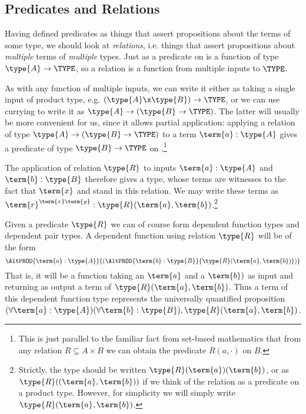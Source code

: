 \subsection{Predicates and Relations}

Having defined predicates as things that assert propositions about the terms of some type, we should look at \emph{relations}, i.e. things that assert propositions about \emph{multiple} terms of \emph{multiple} types.  Just as a predicate on  is a function of type 
$\type{A} \to \TYPE$, so a relation is a function from multiple inputs to $\TYPE$.  

As with any function of multiple inputs, we can write it either as taking a single input of product type, e.g. 
$(\type{A} \x \type{B}) \to \TYPE$, or we can use currying to write it as $\type{A} \to (\type{B} \to \TYPE)$.  The latter will usually be more convenient for us, since it allows partial application: applying a relation of type
$\type{A} \to (\type{B} \to \TYPE)$ to a term $\term{a}:\type{A}$ gives a predicate 
of type $\type{B} \to \TYPE$ on .\footnote{
This is just parallel to the familiar fact from set-based mathematics that from any relation $R \subseteq A \times B$ we can obtain the predicate $R(a,\cdot)$ on $B$.
}

The application of relation $\type{R}$ to inputs $\term{a}:\type{A}$ and $\term{b}:\type{B}$ therefore gives a type, whose terms are witnesses to the fact that $\term{x}$ and  stand in this relation.  We may write these terms as $\term{r}^{\term{x}\term{y}}:\type{R}(\term{a}, \term{b})$.\footnote{
Strictly, the type should be written 
$\type{R}(\term{a})(\term{b})$, or as $\type{R}((\term{a}, \term{b}))$ if we think of the relation as a predicate on a product type.  However, for simplicity we will simply write $\type{R}(\term{a}, \term{b})$.
}



Given a predicate $\type{R}$
we can of course form dependent function types and dependent pair types.  A dependent function using relation
$\type{R}$
will be of the form
\[
\AltPROD{\term{a}:\type{A}}{
(\AltPROD{\term{b}:\type{B}}
{\type{R}(\term{a},\term{b})})
}
\]
That is, it will be a function taking an $\term{a}$ and a $\term{b})$ as input and returning as output a term of $\type{R}(\term{a},\term{b})$.  
Thus a term of this dependent function type represents the universally quantified proposition 
$(\forall \term{a}:\type{A})(\forall \term{b}:\type{B}), {\type{R}(\term{a},\term{b})}$.

